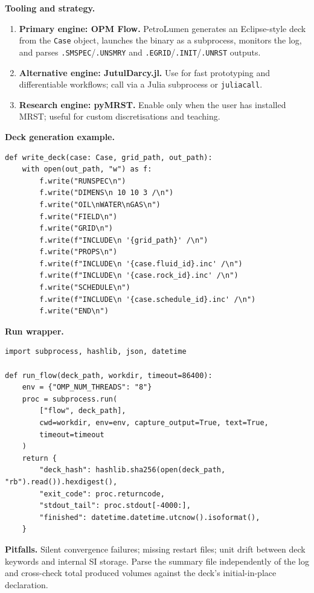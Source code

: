 \documentclass[11pt,a4paper]{article}
\begin{document}
\textbf{Tooling and strategy.}
\begin{enumerate}[leftmargin=1.4em]
  \item \textbf{Primary engine: OPM Flow.} PetroLumen generates an Eclipse-style
        deck from the \texttt{Case} object, launches the binary as a subprocess,
        monitors the log, and parses \texttt{.SMSPEC}/\texttt{.UNSMRY} and
        \texttt{.EGRID}/\texttt{.INIT}/\texttt{.UNRST} outputs.
  \item \textbf{Alternative engine: JutulDarcy.jl.} Use for fast prototyping and
        differentiable workflows; call via a Julia subprocess or \texttt{juliacall}.
  \item \textbf{Research engine: pyMRST.} Enable only when the user has installed
        MRST; useful for custom discretisations and teaching.
\end{enumerate}

\textbf{Deck generation example.}
\begin{lstlisting}[caption={Minimal deck writer from a Case object.}]
def write_deck(case: Case, grid_path, out_path):
    with open(out_path, "w") as f:
        f.write("RUNSPEC\n")
        f.write("DIMENS\n 10 10 3 /\n")
        f.write("OIL\nWATER\nGAS\n")
        f.write("FIELD\n")
        f.write("GRID\n")
        f.write(f"INCLUDE\n '{grid_path}' /\n")
        f.write("PROPS\n")
        f.write(f"INCLUDE\n '{case.fluid_id}.inc' /\n")
        f.write(f"INCLUDE\n '{case.rock_id}.inc' /\n")
        f.write("SCHEDULE\n")
        f.write(f"INCLUDE\n '{case.schedule_id}.inc' /\n")
        f.write("END\n")
\end{lstlisting}

\textbf{Run wrapper.}
\begin{lstlisting}[caption={Subprocess isolation keeps the GPL boundary clean.}]
import subprocess, hashlib, json, datetime

def run_flow(deck_path, workdir, timeout=86400):
    env = {"OMP_NUM_THREADS": "8"}
    proc = subprocess.run(
        ["flow", deck_path],
        cwd=workdir, env=env, capture_output=True, text=True,
        timeout=timeout
    )
    return {
        "deck_hash": hashlib.sha256(open(deck_path, "rb").read()).hexdigest(),
        "exit_code": proc.returncode,
        "stdout_tail": proc.stdout[-4000:],
        "finished": datetime.datetime.utcnow().isoformat(),
    }
\end{lstlisting}

\textbf{Pitfalls.} Silent convergence failures; missing restart files; unit
drift between deck keywords and internal SI storage. Parse the summary file
independently of the log and cross-check total produced volumes against the
deck's initial-in-place declaration.
\end{document}
